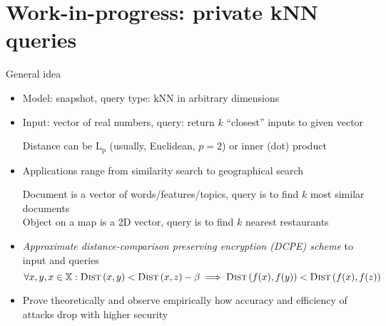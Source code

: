 \section{Work-in-progress: private kNN queries}

	\begin{frame}{General idea}

		\begin{itemize}
			\item<1->
				Model: \alert{snapshot}, query type: \alert{kNN} in arbitrary dimensions

			\item<2->
				Input: vector of real numbers, query: return $k$ ``closest'' inputs to given vector \\
				\begin{small}
					Distance can be $\text{L}_\text{p}$ (usually, Euclidean, $p = 2$) or inner (dot) product
				\end{small}

			\item<3->
				Applications range from similarity search to geographical search \\
				\begin{small}
					Document is a vector of words/features/topics, query is to find $k$ most similar documents \\
					Object on a map is a 2D vector, query is to find $k$ nearest restaurants
				\end{small}

			\item<4->
				\emph{Approximate distance-comparison preserving encryption (DCPE) scheme} to input and queries
				\[
					\forall x, y, x \in \mathbb{X} : \algo{Dist}{x, y} < \algo{Dist}{x, z} - \beta \implies \algo{Dist}{f(x), f(y)} < \algo{Dist}{f(x), f(z)}
				\]

			\item<5->
				Prove theoretically and observe empirically how accuracy and efficiency of attacks drop with higher security
		\end{itemize}

	\end{frame}

